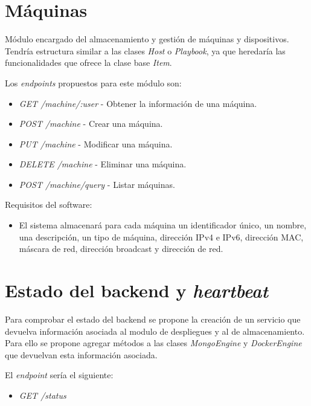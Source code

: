 \section{Máquinas}

Módulo encargado del almacenamiento y gestión de máquinas y dispositivos. Tendría estructura similar a las clases \textit{Host} o \textit{Playbook}, ya que heredaría las funcionalidades que ofrece la clase base \textit{Item}.

\bigskip
Los \textit{endpoints} propuestos para este módulo son:
\begin{itemize}
	\item \textit{GET /machine/:user} - Obtener la información de una máquina.
	\item \textit{POST /machine} - Crear una máquina.
	\item \textit{PUT /machine} - Modificar una máquina.
	\item \textit{DELETE /machine} - Eliminar una máquina.
	\item \textit{POST /machine/query} - Listar máquinas.
\end{itemize}



\bigskip
Requisitos del software:
\begin{itemize}
	\item El sistema almacenará para cada máquina un identificador único, un nombre, una descripción, un tipo de máquina, dirección IPv4 e IPv6, dirección MAC, máscara de red, dirección broadcast y dirección de red.
\end{itemize}





\section{Estado del backend y \textit{heartbeat}}


Para comprobar el estado del backend se propone la creación de un servicio que devuelva información asociada al modulo de despliegues y al de almacenamiento. Para ello se propone agregar métodos a las clases \textit{MongoEngine} y \textit{DockerEngine} que devuelvan esta información asociada.

\bigskip
El \textit{endpoint} sería el siguiente:
\begin{itemize}
	\item \textit{GET /status}
\end{itemize}

